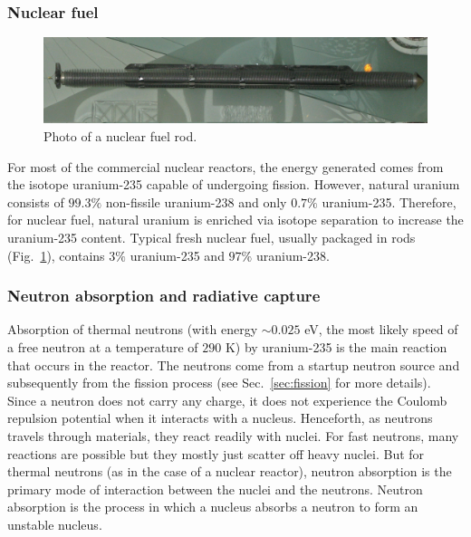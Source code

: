 \documentclass[nofootinbib,preprint,aps]{revtex4-1}
\begin{document}
    \subsubsection{Nuclear fuel}
        \begin{figure}
            \centering
            \includegraphics[width=\textwidth]{rod.jpg}
            \caption{Photo of a nuclear fuel rod.\cite{rodpic}}
            \label{fig:rod}
        \end{figure}
    For most of the commercial nuclear reactors, the energy generated comes from the isotope uranium-235 capable
    of undergoing fission.
    However, natural uranium consists of $99.3\%$
    non-fissile uranium-238 and only $0.7\%$ uranium-235. Therefore, for nuclear fuel, natural uranium is enriched
    via isotope separation to increase the uranium-235 content. Typical fresh nuclear fuel, usually packaged in
    rods (Fig.~\ref{fig:rod}), contains $3\%$ uranium-235 and $97\%$ uranium-238.

    \subsubsection{Neutron absorption and radiative capture}
    \label{sec:capture}
    Absorption of thermal neutrons (with energy $\sim 0.025$ eV, the most likely speed of a free neutron at 
    a temperature of $290$ K) by uranium-235 is the main reaction that
    occurs in the reactor. The neutrons come from a startup neutron source and subsequently from the fission
    process (see Sec.~\ref{sec:fission} for more details).
    Since a neutron does not carry any charge, it does not experience the Coulomb repulsion potential when
    it interacts
    with a nucleus.
    Henceforth, as neutrons travels through materials, they react readily with nuclei.
    For fast neutrons, many reactions are possible but they mostly just scatter off heavy nuclei.
    But for thermal neutrons (as in the case of a nuclear reactor), neutron absorption
    is the primary mode of interaction between the nuclei and the neutrons.
    Neutron absorption is the process in which a nucleus absorbs a neutron to form an unstable
    nucleus.
\end{document}
